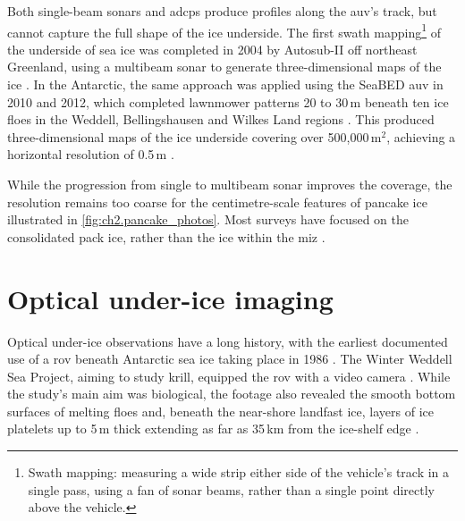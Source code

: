 
Both single-beam sonars and \glspl{adcp} produce profiles along the \gls{auv}'s track, but
cannot capture the full shape of the ice underside. The first swath mapping\footnote{Swath mapping: measuring a wide strip either side of the vehicle's track in a single pass, using a fan of sonar beams, rather than a single point directly above the vehicle.} of
the underside of sea ice was completed in 2004 by Autosub-II off northeast
Greenland, using a multibeam sonar to generate three-dimensional maps of the
ice \cite{wadhamsNewViewUnderside2006}. In the Antarctic, the same approach
was applied using the SeaBED \gls{auv} in 2010 and 2012, which completed lawnmower
patterns 20 to 30\,m beneath ten ice floes in the Weddell, Bellingshausen and
Wilkes Land regions \cite{williamsThickDeformedAntarctic2015}.
 This produced three-dimensional maps of the ice underside
covering over 500{,}000\,m$^2$, achieving a
horizontal resolution of 0.5\,m \cite{williamsThickDeformedAntarctic2015}.


While the progression from single to multibeam sonar improves the coverage, the resolution remains
too coarse for the centimetre-scale features of pancake ice illustrated in \autoref{fig:ch2.pancake_photos}.
Most surveys have focused on the consolidated pack ice, rather than the ice within the \gls{miz} \cite{sandvenSeaIceRemote2023}.%





\section{Optical under-ice imaging}
\label{sec:ch2.optical_imaging}
Optical under-ice observations have a long history, with the earliest documented use of a \gls{rov} beneath Antarctic sea ice
taking place in 1986 \cite{hempelAntarcticMarineResearch1988}. The Winter Weddell Sea Project, aiming to study krill, equipped
the \gls{rov} with a video camera
\cite{marschallOverwinteringStrategyAntarctic1988,langeDevelopmentSeaIce1989}.
While the study's main aim was biological, the footage also revealed the smooth
bottom surfaces of melting floes and, beneath the near-shore landfast ice,
layers of ice platelets up to 5\,m thick extending as far as 35\,km from the
ice-shelf edge \cite{langeDevelopmentSeaIce1989}.

